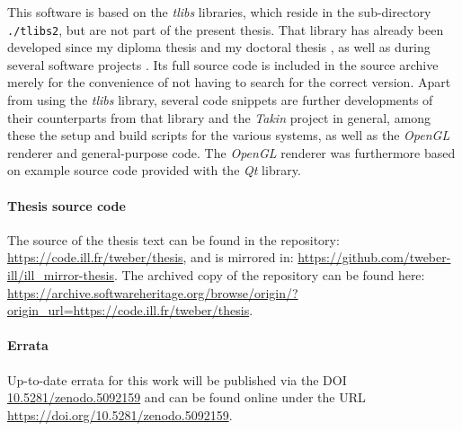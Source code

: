 This software is based on the \textit{tlibs} libraries, which reside in the 
sub-directory \lstinline|./tlibs2|, but are not part of the present thesis.
That library has already been developed since my diploma thesis \cite{DiplomaWeber} 
and my doctoral thesis \cite{PhDWeber}, as well as during several software 
projects \cite{Weber2014, Takin2016, Takin2017, Takin2021}.
Its full source code is included in the source archive merely for the convenience of not
having to search for the correct version.
Apart from using the \textit{tlibs} library, several code snippets are further developments
of their counterparts from that library and the \textit{Takin} project \cite{Takin2021, Takin2017, Takin2016} in general, 
among these the setup and build scripts for the various systems, 
as well as the \textit{OpenGL} renderer and general-purpose code.
The \textit{OpenGL} renderer was furthermore based on example source code \cite{web_QOpenGLWidgetExampleThreaded} provided
with the \textit{Qt} \cite{web_Qt} library.


\paragraph{Thesis source code}
The source of the thesis text can be found in the repository:
\url{https://code.ill.fr/tweber/thesis}, and is mirrored in:
\url{https://github.com/tweber-ill/ill_mirror-thesis}.
The archived copy of the repository can be found here:
\url{https://archive.softwareheritage.org/browse/origin/?origin_url=https://code.ill.fr/tweber/thesis}.



\paragraph{Errata}
Up-to-date errata for this work will be published via the DOI
\href{https://doi.org/10.5281/zenodo.5092159}{10.5281/zenodo.5092159}
and can be found online under the URL \url{https://doi.org/10.5281/zenodo.5092159}.
